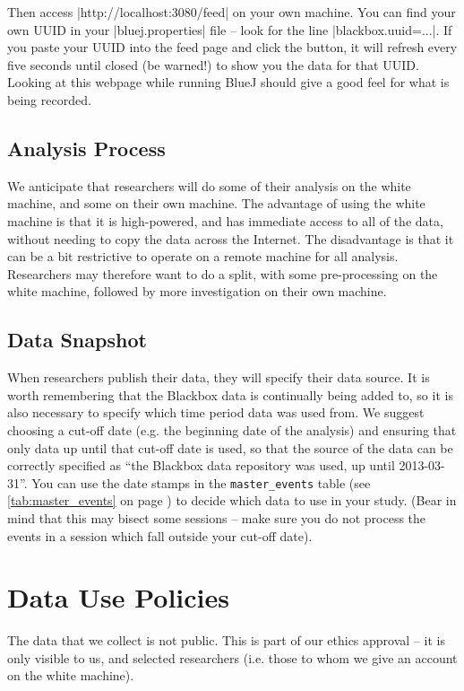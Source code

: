 \documentclass{report}
\newcommand{\myref}[1]{\autoref{#1} on page \pageref*{#1}}
\newcommand{\tabref}[1]{\lstinline|#1| table (see \myref{tab:#1})}
\begin{document}
Then access |http://localhost:3080/feed| on your own machine.  You can find
your own UUID in your |bluej.properties| file -- look for the line
|blackbox.uuid=...|.  If you paste your UUID into the feed page and click the
button, it will refresh every five seconds until closed (be warned!) to show
you the data for that UUID.  Looking at this webpage while running BlueJ
should give a good feel for what is being recorded.

\section{Analysis Process}

We anticipate that researchers will do some of their analysis on the white
machine, and some on their own machine.  The advantage of using the white
machine is that it is high-powered, and has immediate access to all of the
data, without needing to copy the data across the Internet.  The disadvantage
is that it can be a bit restrictive to operate on a remote machine for all
analysis.  Researchers may therefore want to do a split, with some
pre-processing on the white machine, followed by more investigation on their
own machine.

\section{Data Snapshot}

When researchers publish their data, they will specify their data source.  It
is worth remembering that the Blackbox data is continually being added to, so
it is also necessary to specify which time period data was used from.  We
suggest choosing a cut-off date (e.g. the beginning date of the analysis) and
ensuring that only data up until that cut-off date is used, so that the source
of the data can be correctly specified as ``the Blackbox data repository was
used, up until 2013-03-31''.  You can use the date stamps in the
\tabref{master_events} to decide which data to use in your study.  (Bear in
mind that this may bisect some sessions -- make sure you do not process the
events in a session which fall outside your cut-off date).

\chapter{Data Use Policies}

The data that we collect is not public.  This is part of our ethics approval
-- it is only visible to us, and selected researchers (i.e. those to whom we
give an account on the white machine).  
\end{document}
